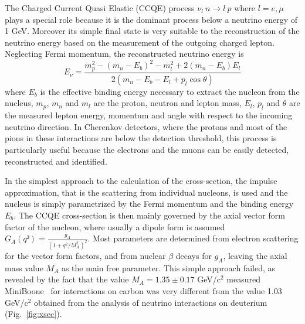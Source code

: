 The Charged Current Quasi Elastic (CCQE) process $\nu_l \: n \rightarrow l \: p$ where $l=e,\mu$ plays a special role because it is the dominant process below a neutrino energy of 1 GeV. Moreover its simple final state is very suitable to the reconstruction of the neutrino energy based on the measurement of the outgoing charged lepton. Neglecting Fermi momentum, the reconstructed neutrino energy is 
\begin{equation}
E_\nu = \frac{m_p^2 - (m_n-E_b)^2 - m^2_l + 2 (m_n-E_b)E_l}{2 (m_n - E_b - E_l + p_l \cos \theta)}
\end{equation}
 where $E_b$ is the effective binding energy necessary to extract the nucleon from the nucleus, $m_p$, $m_n$ and $m_l$  are the proton, neutron and lepton mass, $E_l$, $p_l$ and $\theta$ are the measured lepton energy, momentum and angle with respect to the incoming neutrino direction. 
 In Cherenkov detectors, where the protons and most of the pions in these interactions are below the detection threshold, this process is particularly useful because the electrons and the muons can be easily detected, reconstructed and identified. 

In the simplest approach to the calculation of the cross-section, the impulse approximation, that is the scattering from individual nucleons, is used and the nucleus is simply parametrized by the Fermi momentum and the binding energy $E_b$. The CCQE cross-section is then mainly governed by the axial vector form factor of the nucleon, where usually a dipole form is assumed
$ G_A (q²) = \frac {g_A} {(1+q^2/M^2_A)^2}$.
Most parameters are determined from electron scattering for the vector form factors, and from nuclear $\beta$ decays for $g_A$, leaving the axial mass value $M_A$ as the main free parameter. This simple approach failed, as revealed by the fact that the value $M_A =  1.35 \pm 0.17$ GeV/c$^2$ measured MiniBoone~\cite{miniboone-ccqe} for interactions on carbon was very different from the value 1.03 GeV/c$^2$ obtained from the analysis of neutrino interactions on deuterium (Fig.~\ref{fig:xsec}).

